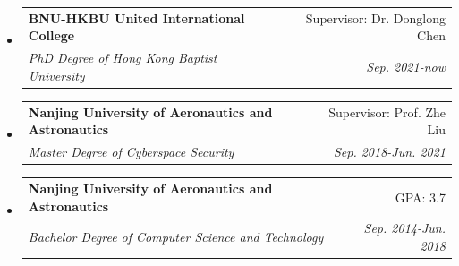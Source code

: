 \documentclass[letterpaper,11pt]{article}
\makeatletter
\newcommand{\resitem}[1]{\item #1 \vspace{-2pt}}
\newcommand{\ressubheading}[4]{
\begin{tabular*}{6.5in}{l@{\cftdotfill{\cftsecdotsep}\extracolsep{\fill}}r}
		\textbf{#1} & #2 \\
		\textit{#3} & \textit{#4} \\
\end{tabular*}\vspace{-6pt}}
\makeatother
\begin{document}
\begin{itemize}
\item
	\ressubheading{BNU-HKBU United International College}{Supervisor: Dr. Donglong Chen}{PhD Degree of Hong Kong Baptist University}{Sep. 2021-now}
%
\item
	\ressubheading{Nanjing University of Aeronautics and Astronautics}{Supervisor: Prof. Zhe Liu}{Master Degree of Cyberspace Security}{Sep. 2018-Jun. 2021}
%

\item
	\ressubheading{Nanjing University of Aeronautics and Astronautics}{GPA: 3.7}{Bachelor Degree of Computer Science and Technology}{Sep. 2014-Jun. 2018}
%

\end{itemize}

%
\end{document}
